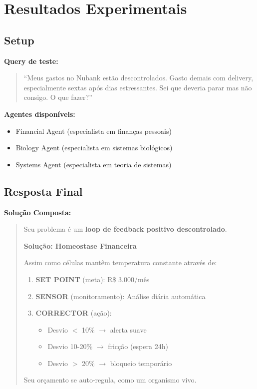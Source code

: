 \documentclass[11pt]{article}
\begin{document}
\section{Resultados Experimentais}

\subsection{Setup}

\textbf{Query de teste:}

\begin{quote}
``Meus gastos no Nubank estão descontrolados. Gasto demais com delivery, especialmente sextas após dias estressantes. Sei que deveria parar mas não consigo. O que fazer?''
\end{quote}

\textbf{Agentes disponíveis:}
\begin{itemize}
    \item Financial Agent (especialista em finanças pessoais)
    \item Biology Agent (especialista em sistemas biológicos)
    \item Systems Agent (especialista em teoria de sistemas)
\end{itemize}

\subsection{Resposta Final}

\textbf{Solução Composta:}

\begin{quote}
Seu problema é um \textbf{loop de feedback positivo descontrolado}.

\textbf{Solução: Homeostase Financeira}

Assim como células mantêm temperatura constante através de:

\begin{enumerate}
    \item \textbf{SET POINT} (meta): R\$ 3.000/mês
    \item \textbf{SENSOR} (monitoramento): Análise diária automática
    \item \textbf{CORRECTOR} (ação):
    \begin{itemize}
        \item Desvio $<$ 10\% $\rightarrow$ alerta suave
        \item Desvio 10-20\% $\rightarrow$ fricção (espera 24h)
        \item Desvio $>$ 20\% $\rightarrow$ bloqueio temporário
    \end{itemize}
\end{enumerate}

Seu orçamento se auto-regula, como um organismo vivo.
\end{quote}
\end{document}
